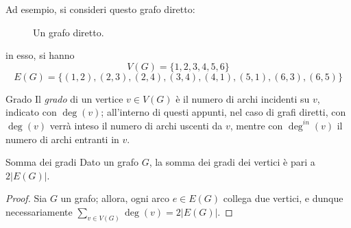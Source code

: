 \documentclass[a4paper, 12pt]{report}
\begin{document}
    \begin{example}
        Ad esempio, si consideri questo grafo diretto:

        \begin{figure}[H]
            \centering
            \caption{Un grafo diretto.}
        \end{figure}

        in esso, si hanno $$V(G) = \{1, 2, 3, 4, 5, 6\}$$ $$E(G) = \{(1, 2), (2, 3), (2, 4), (3, 4), (4, 1), (5, 1), (6, 3), (6, 5)\}$$
    \end{example}

    \begin{frameddefn}{Grado}
        Il \textit{grado} di un vertice $v \in V(G)$ è il numero di archi incidenti su $v$, indicato con $\deg(v)$; all'interno di questi appunti, nel caso di grafi diretti, con $\deg(v)$ verrà inteso il numero di archi uscenti da $v$, mentre con $\deg^{in}(v)$ il numero di archi entranti in $v$.
    \end{frameddefn}

    \begin{framedlem}[label={Somma dei gradi}]{Somma dei gradi}
        Dato un grafo $G$, la somma dei gradi dei vertici è pari a $2 |E(G)|$.
    \end{framedlem}

    \begin{proof}
        Sia $G$ un grafo; allora, ogni arco $e \in E(G)$ collega due vertici, e dunque necessariamente $\displaystyle \sum_{v \in V(G)}{\deg(v)} = 2 |E(G)|$.
    \end{proof}
\end{document}
